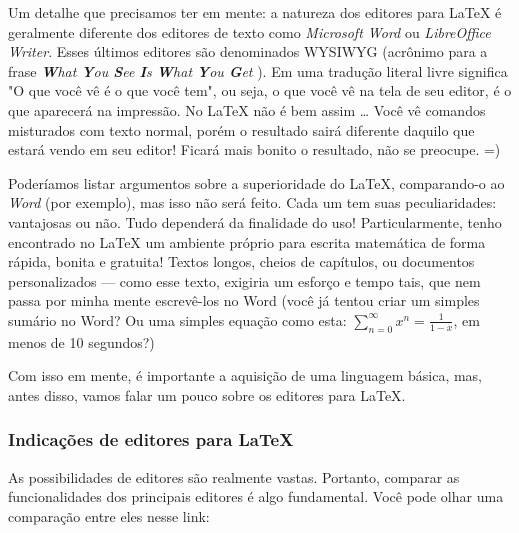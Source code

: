 Um detalhe que precisamos ter em mente: a natureza dos editores para \LaTeX{}
é geralmente diferente dos editores de texto como \textit{Microsoft Word} ou 
\textit{LibreOffice Writer}.
Esses últimos editores são denominados WYSIWYG (acrônimo para a frase 
\textit{
  \textbf{W}hat \textbf{Y}ou \textbf{S}ee \textbf{I}s \textbf{W}hat \textbf{Y}ou \textbf{G}et
}).
Em uma tradução literal livre significa "O que você vê é o que você tem", ou 
seja, o que você vê na tela de seu editor, é o que aparecerá na impressão. 
No \LaTeX{} não é bem assim \ldots 
Você vê comandos misturados com texto normal, porém o resultado sairá diferente 
daquilo que estará vendo em seu editor! 
Ficará mais bonito o resultado, não se preocupe. =)

Poderíamos listar argumentos sobre a superioridade do \LaTeX{}, comparando-o ao 
\textit{Word} (por exemplo), mas isso não será feito. 
Cada um tem suas peculiaridades: vantajosas ou não. 
Tudo dependerá da finalidade do uso!
Particularmente, tenho encontrado no \LaTeX{} um ambiente próprio para escrita 
matemática de forma rápida, bonita e gratuita! 
Textos longos, cheios de capítulos, ou documentos personalizados --- como esse 
texto, exigiria um esforço e tempo tais, que nem passa por minha mente 
escrevê-los no Word (você já tentou criar um simples sumário no Word? 
Ou uma simples equação como esta: $\sum\limits_{n = 0}^{\infty} x^n = \frac{1}{1 - x}$, 
em menos de 10 segundos?)

Com isso em mente, é importante a aquisição de uma linguagem básica, mas, antes 
disso, vamos falar um pouco sobre os editores para \LaTeX.

\subsubsection{Indicações de editores para \LaTeX} %

As possibilidades de editores são realmente vastas.
Portanto, comparar as funcionalidades dos principais editores é algo fundamental.
Você pode olhar uma comparação entre eles nesse link:


